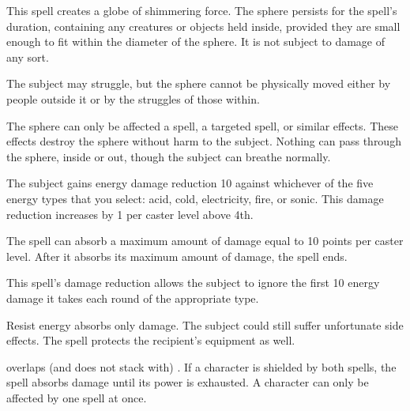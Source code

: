 \spelldur{\durshort \dismissable}
\begin{spelleffect}
    This spell creates a globe of shimmering force. The sphere persists for the spell's duration, containing any creatures or objects held inside, provided they are small enough to fit within the diameter of the sphere. It is not subject to damage of any sort.
    \par The subject may struggle, but the sphere cannot be physically moved either by people outside it or by the struggles of those within.
\end{spelleffect}
\begin{spellnotes}
    The sphere can only be affected a  spell, a targeted  spell, or similar effects. These effects destroy the sphere without harm to the subject. Nothing can pass through the sphere, inside or out, though the subject can breathe normally.
\end{spellnotes}

\begin{spelleffect}
    The subject gains energy damage reduction 10 against whichever of the five energy types that you select: acid, cold, electricity, fire, or sonic. This damage reduction increases by 1 per caster level above 4th.
    \par The spell can absorb a maximum amount of damage equal to 10 points per caster level. After it absorbs its maximum amount of damage, the spell ends.
\end{spelleffect}
\begin{spellnotes}
    This spell's damage reduction allows the subject to ignore the first 10 energy damage it takes each round of the appropriate type.

    Resist energy absorbs only damage. The subject could still suffer unfortunate side effects. The spell protects the recipient's equipment as well.
    \par {} overlaps (and does not stack with) . If a character is shielded by both spells, the  spell absorbs damage until its power is exhausted. A character can only be affected by one  spell at once.
\end{spellnotes}

